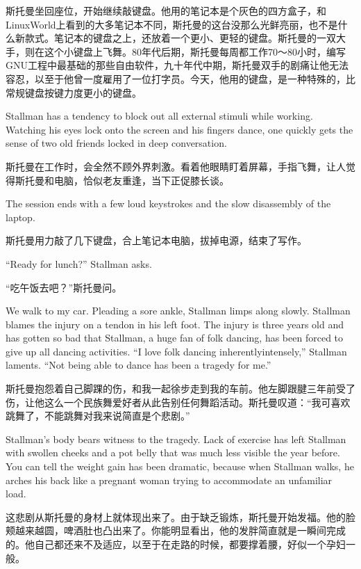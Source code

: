 \ifdefined\chs
斯托曼坐回座位，开始继续敲键盘。他用的笔记本是个灰色的四方盒子，和LinuxWorld上看到的大多笔记本不同，斯托曼的这台没那么光鲜亮丽，也不是什么新款式。笔记本的键盘之上，还放着一个更小、更轻的键盘。斯托曼的一双大手，则在这个小键盘上飞舞。\ifdefined\vone 80年代后期，斯托曼每周都工作70～80小时，编写GNU工程中最基础的那些自由软件，\fi\ifdefined\vtwo 九十年代中期，斯托曼\fi 双手的剧痛让他无法容忍，以至于他曾一度雇用了一位打字员。今天，他用的键盘，是一种特殊的，比常规键盘按键力度更小的键盘。
\fi

\ifdefined\eng
Stallman has a tendency to block out all external stimuli while working. Watching his eyes lock onto the screen and his fingers dance, one quickly gets the sense of two old friends locked in deep conversation.
\fi

\ifdefined\chs
斯托曼在工作时，会全然不顾外界刺激。看着他眼睛盯着屏幕，手指飞舞，让人觉得斯托曼和电脑，恰似老友重逢，当下正促膝长谈。
\fi

\ifdefined\eng
The session ends with a few loud keystrokes and the slow disassembly of the laptop.
\fi

\ifdefined\chs
斯托曼用力敲了几下键盘，合上笔记本电脑，拔掉电源，结束了写作。
\fi

\ifdefined\eng
``Ready for lunch?'' Stallman asks.
\fi

\ifdefined\chs
``吃午饭去吧？''斯托曼问。
\fi

\ifdefined\eng
We walk to my car. Pleading a sore ankle, Stallman limps along slowly. Stallman blames the injury on a tendon in his left foot. The injury is three years old and has gotten so bad that Stallman, a huge fan of folk dancing, has been forced to give up all dancing activities. ``I love folk dancing \ifdefined\vone inherently\fi\ifdefined\vtwo intensely\fi ,'' Stallman laments. ``Not being able to dance has been a tragedy for me.''
\fi

\ifdefined\chs
斯托曼抱怨着自己脚踝的伤，和我一起徐步走到我的车前。他左脚跟腱三年前受了伤，让他这么一个民族舞爱好者从此告别任何舞蹈活动。斯托曼叹道：``我可喜欢跳舞了，不能跳舞对我来说简直是个悲剧。''
\fi

\ifdefined\eng
Stallman's body bears witness to the tragedy. Lack of exercise has left Stallman with swollen cheeks and a pot belly that was much less visible the year before. You can tell the weight gain has been dramatic, because when Stallman walks, he arches his back like a pregnant woman trying to accommodate an unfamiliar load.
\fi

\ifdefined\chs
这悲剧从斯托曼的身材上就体现出来了。由于缺乏锻炼，斯托曼开始发福。他的脸颊越来越圆，啤酒肚也凸出来了。你能明显看出，他的发胖简直就是一瞬间完成的。他自己都还来不及适应，以至于在走路的时候，都要撑着腰，好似一个孕妇一般。
\fi


